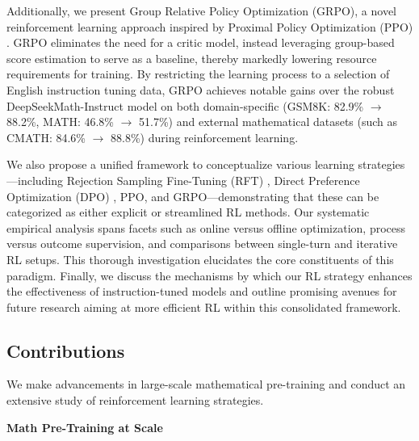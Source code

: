 Additionally, we present Group Relative Policy Optimization (GRPO), a novel reinforcement learning approach inspired by Proximal Policy Optimization (PPO) \citep{schulman2017proximal}. GRPO eliminates the need for a critic model, instead leveraging group-based score estimation to serve as a baseline, thereby markedly lowering resource requirements for training. By restricting the learning process to a selection of English instruction tuning data, GRPO achieves notable gains over the robust DeepSeekMath-Instruct model on both domain-specific (GSM8K: 82.9\% $\rightarrow$ 88.2\%, MATH: 46.8\% $\rightarrow$ 51.7\%) and external mathematical datasets (such as CMATH: 84.6\% $\rightarrow$ 88.8\%) during reinforcement learning.

We also propose a unified framework to conceptualize various learning strategies—including Rejection Sampling Fine-Tuning (RFT) \citep{yuan2023scaling}, Direct Preference Optimization (DPO) \citep{dpo}, PPO, and GRPO—demonstrating that these can be categorized as either explicit or streamlined RL methods. Our systematic empirical analysis spans facets such as online versus offline optimization, process versus outcome supervision, and comparisons between single-turn and iterative RL setups. This thorough investigation elucidates the core constituents of this paradigm. Finally, we discuss the mechanisms by which our RL strategy enhances the effectiveness of instruction-tuned models and outline promising avenues for future research aiming at more efficient RL within this consolidated framework.

\subsection{Contributions}
We make advancements in large-scale mathematical pre-training and conduct an extensive study of reinforcement learning strategies.

\textbf{Math Pre-Training at Scale}

